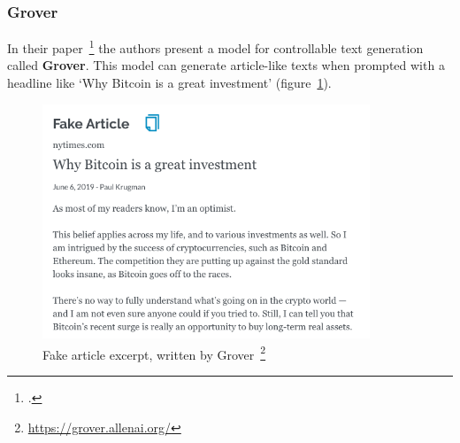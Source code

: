 \subsubsection{Grover}
\label{sub:grover}

In their paper~\footcite{zellers2019neuralfakenews} the authors present a model for controllable text generation called \textbf{Grover}. This model can generate article-like texts when prompted with a headline like `Why Bitcoin is a great investment' (figure~\ref{fig:grover}).

\begin{figure}[h]
  	\includegraphics[height=7cm]{img/grover_fake_article}
  	\caption[Fake article excerpt, written by Grover]{Fake article excerpt, written by Grover~\footnote{\url{https://grover.allenai.org/}}}
	\label{fig:grover}
\end{figure}

